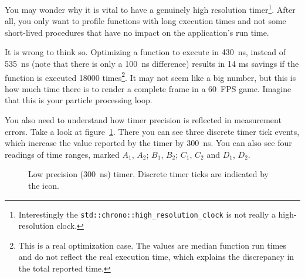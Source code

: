 \documentclass[hidelinks,titlepage,a4paper]{article}
\begin{document}
You may wonder why it is vital to have a genuinely high resolution timer\footnote{Interestingly the \texttt{std::chrono::high\_resolution\_clock} is not really a high-resolution clock.}. After all, you only want to profile functions with long execution times and not some short-lived procedures that have no impact on the application's run time.

It is wrong to think so. Optimizing a function to execute in 430~\si{\nano\second}, instead of 535~\si{\nano\second} (note that there is only a 100~\si{\nano\second} difference) results in 14 \si{\milli\second} savings if the function is executed 18000 times\footnote{This is a real optimization case. The values are median function run times and do not reflect the real execution time, which explains the discrepancy in the total reported time.}. It may not seem like a big number, but this is how much time there is to render a complete frame in a 60~FPS game. Imagine that this is your particle processing loop.

You also need to understand how timer precision is reflected in measurement errors. Take a look at figure~\ref{timer}. There you can see three discrete timer tick events, which increase the value reported by the timer by 300~\si{\nano\second}. You can also see four readings of time ranges, marked $A_1$, $A_2$; $B_1$, $B_2$; $C_1$, $C_2$ and $D_1$, $D_2$.

\begin{figure}[h]
\centering{}
\caption{Low precision (300~ns) timer. Discrete timer ticks are indicated by the \faClock{} icon.}
\label{timer}
\end{figure}
\end{document}
